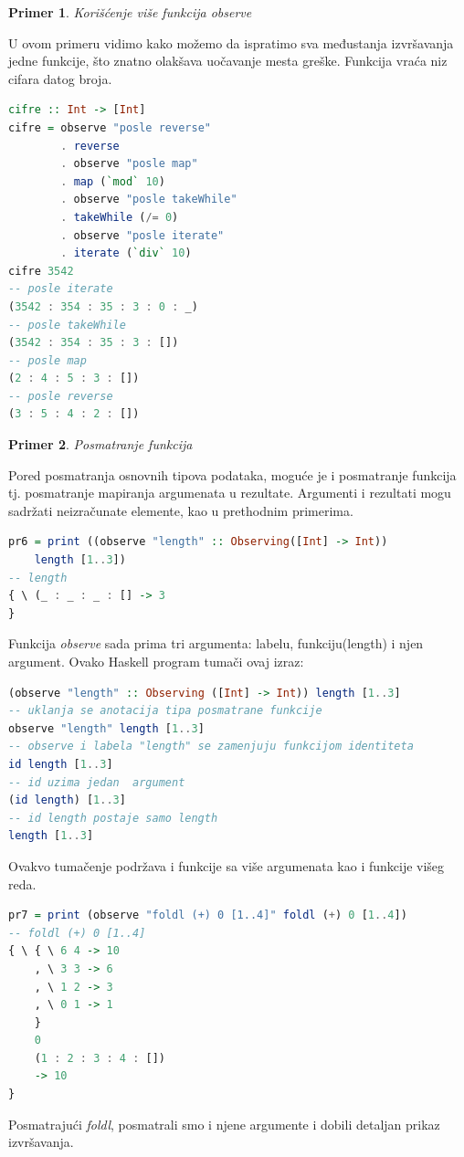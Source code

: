 \documentclass[a4paper]{article}
\newtheorem{primer}{Primer}[section]
\begin{document}
\begin{primer} 
Korišćenje više funkcija observe
\end{primer}
U ovom primeru vidimo kako možemo da ispratimo sva međustanja izvršavanja jedne funkcije, što znatno olakšava uočavanje mesta greške.
Funkcija vraća niz cifara datog broja.
\begin{lstlisting}[language=Haskell]
cifre :: Int -> [Int]
cifre = observe "posle reverse" 
		. reverse
		. observe "posle map"
		. map (`mod` 10)
		. observe "posle takeWhile"
		. takeWhile (/= 0)
		. observe "posle iterate"
		. iterate (`div` 10)
cifre 3542
-- posle iterate
(3542 : 354 : 35 : 3 : 0 : _)
-- posle takeWhile
(3542 : 354 : 35 : 3 : [])
-- posle map
(2 : 4 : 5 : 3 : [])
-- posle reverse
(3 : 5 : 4 : 2 : [])
\end{lstlisting}


\begin{primer}
Posmatranje funkcija
\end{primer}
Pored posmatranja osnovnih tipova podataka, moguće je i posmatranje funkcija tj. posmatranje mapiranja argumenata u rezultate.
Argumenti i rezultati mogu sadržati neizračunate elemente, kao u prethodnim primerima.
\begin{lstlisting}[language=Haskell]
pr6 = print ((observe "length" :: Observing([Int] -> Int)) 
	length [1..3])
-- length
{ \ (_ : _ : _ : [] -> 3
}
\end{lstlisting}
Funkcija {\em observe} sada prima tri argumenta: labelu, funkciju(length) i njen argument. 
Ovako Haskell program tumači ovaj izraz:
\begin{lstlisting}[language=Haskell]
(observe "length" :: Observing ([Int] -> Int)) length [1..3]
-- uklanja se anotacija tipa posmatrane funkcije
observe "length" length [1..3]
-- observe i labela "length" se zamenjuju funkcijom identiteta
id length [1..3]
-- id uzima jedan  argument
(id length) [1..3]
-- id length postaje samo length
length [1..3]
\end{lstlisting}

Ovakvo tumačenje podržava i funkcije sa više argumenata kao i funkcije višeg reda.

\begin{lstlisting}[language=Haskell]
pr7 = print (observe "foldl (+) 0 [1..4]" foldl (+) 0 [1..4])
-- foldl (+) 0 [1..4]
{ \ { \ 6 4 -> 10
    , \ 3 3 -> 6
    , \ 1 2 -> 3
    , \ 0 1 -> 1
    }
    0
    (1 : 2 : 3 : 4 : [])
    -> 10
} 
\end{lstlisting}
Posmatrajući {\em foldl}, posmatrali smo i njene argumente i dobili detaljan prikaz izvršavanja.
\end{document}
